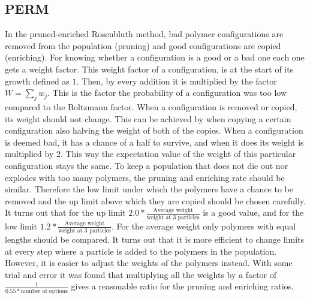 \documentclass{article}
\begin{document}
\begin{multicols}{2}
\subsection*{PERM}
In the pruned-enriched Rosenbluth method, bad polymer configurations are removed from the population (pruning) and good configurations are copied (enriching). For knowing whether a configuration is a good or a bad one each one gets a weight factor. This weight factor of a configuration, is at the start of its growth defined as $1$. Then, by every addition it is multiplied by the factor $W=\sum_{j}w_j$. This is the factor the probability of a configuration was too low compared to the Boltzmann factor. When a configuration is removed or copied, its weight should not change. This can be achieved by when copying a certain configuration also halving the weight of both of the copies. When a configuration is deemed bad, it has a chance of a half to survive, and when it does its weight is multiplied by 2. This way the expectation value of the weight of this particular configuration stays the same. To keep a population that does not die out nor explodes with too many polymers, the pruning and enriching rate should be similar. Therefore the low limit under which the polymers have a chance to be removed and the up limit above which they are copied should be chosen carefully. It turns out that for the up limit $2.0*\frac{\textrm{Average weight}}{\textrm{weight at 3 particles}}$ is a good value, and for the low limit $1.2*\frac{\textrm{Average weight}}{\textrm{weight at 3 particles}}$\cite{Jos}. For the average weight only polymers with equal lengths should be compared. It turns out that it is more efficient to change limits at every step where a particle is added to the polymers in the population. However, it is easier to adjust the weights of the polymers instead. With some trial and error it was found that multiplying all the weights by a factor of $\frac{1}{0.55*\textrm{number of options}}$ gives a reasonable ratio for the pruning and enriching ratios. 


\end{multicols}
\end{document}
